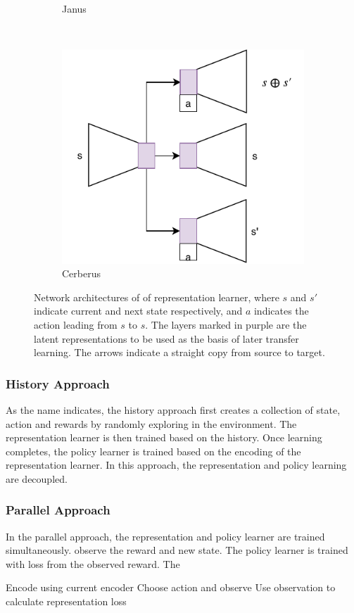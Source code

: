 \begin{figure}[ht!]
\begin{subfigure}{0.5\columnwidth}
		\caption{Janus}
		\label{subfig:repr_learner_janus}
	\end{subfigure}%
	~ 
	\begin{subfigure}{0.5\columnwidth}
		\centering
		\includegraphics[width=\linewidth]{../img/cerberus.pdf}
		\caption{Cerberus}
		\label{subfig:repr_learner_cerberus}
	\end{subfigure}
	\caption{Network architectures of of representation learner, where $s$ and $s'$ indicate current and next state respectively, and $a$ indicates the action leading from $s$ to $s$. 
		The layers marked in purple are the latent representations to be used as the basis of later transfer learning. 
		The arrows indicate a straight copy from source to target.
	}
	\label{fig:approaches}
\end{figure}

\subsubsection{History Approach}
As the name indicates, the history approach first creates a collection of state, action and rewards by randomly exploring in the environment.
The representation learner is then trained based on the history.
Once learning completes, the policy learner is trained based on the encoding of the representation learner.
In this approach, the representation and policy learning are decoupled. 

\subsubsection{Parallel Approach}
In the parallel approach, the representation and policy learner are trained simultaneously.
observe the reward and new state. 
The policy learner is trained with loss from the observed reward.
The 



Encode using current encoder
Choose action and observe
Use observation to calculate representation loss

